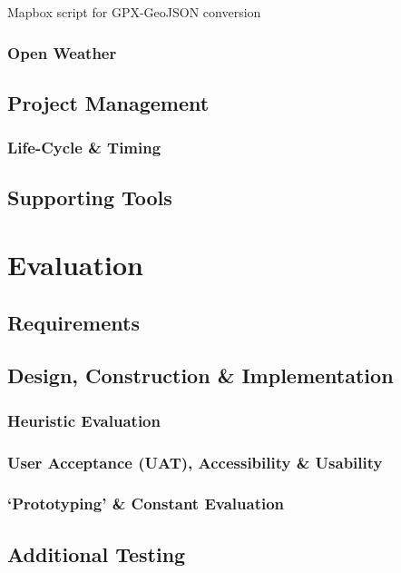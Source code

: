 \documentclass[11pt, english]{article}
\begin{document}
		Mapbox script for GPX-GeoJSON conversion

		\subsubsection{Open Weather}

	\subsection{Project Management}

		\subsubsection{Life-Cycle \& Timing}

		\subsection{Supporting Tools}

\newpage

\section{Evaluation}\label{ch7}

	\subsection{Requirements}

	\subsection{Design, Construction \& Implementation}

		\subsubsection{Heuristic Evaluation}

		\subsubsection{User Acceptance (UAT), Accessibility \& Usability}

		\subsubsection{`Prototyping' \& Constant Evaluation}

	\subsection{Additional Testing}
\end{document}
